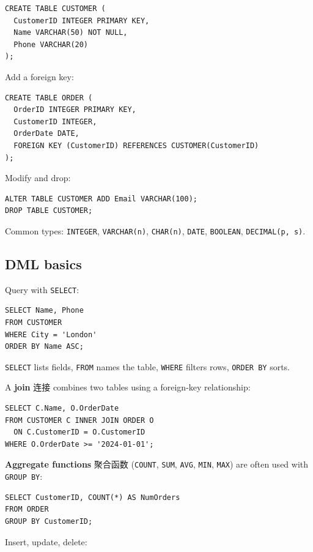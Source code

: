 \documentclass[11pt]{article}
\begin{document}
\begin{Verbatim}
CREATE TABLE CUSTOMER (
  CustomerID INTEGER PRIMARY KEY,
  Name VARCHAR(50) NOT NULL,
  Phone VARCHAR(20)
);
\end{Verbatim}

Add a foreign key:

\begin{Verbatim}
CREATE TABLE ORDER (
  OrderID INTEGER PRIMARY KEY,
  CustomerID INTEGER,
  OrderDate DATE,
  FOREIGN KEY (CustomerID) REFERENCES CUSTOMER(CustomerID)
);
\end{Verbatim}

Modify and drop:

\begin{Verbatim}
ALTER TABLE CUSTOMER ADD Email VARCHAR(100);
DROP TABLE CUSTOMER;
\end{Verbatim}

Common types: \texttt{INTEGER}, \texttt{VARCHAR(n)}, \texttt{CHAR(n)}, \texttt{DATE}, \texttt{BOOLEAN}, \texttt{DECIMAL(p, s)}.

\subsection*{DML basics}

Query with \texttt{SELECT}:

\begin{Verbatim}
SELECT Name, Phone
FROM CUSTOMER
WHERE City = 'London'
ORDER BY Name ASC;
\end{Verbatim}

\texttt{SELECT} lists fields, \texttt{FROM} names the table, \texttt{WHERE} filters rows, \texttt{ORDER BY} sorts.

A \textbf{join} 连接 combines two tables using a foreign-key relationship:

\begin{Verbatim}
SELECT C.Name, O.OrderDate
FROM CUSTOMER C INNER JOIN ORDER O
  ON C.CustomerID = O.CustomerID
WHERE O.OrderDate >= '2024-01-01';
\end{Verbatim}

\textbf{Aggregate functions} 聚合函数 (\texttt{COUNT}, \texttt{SUM}, \texttt{AVG}, \texttt{MIN}, \texttt{MAX}) are often used with \texttt{GROUP BY}:

\begin{Verbatim}
SELECT CustomerID, COUNT(*) AS NumOrders
FROM ORDER
GROUP BY CustomerID;
\end{Verbatim}

Insert, update, delete:
\end{document}
